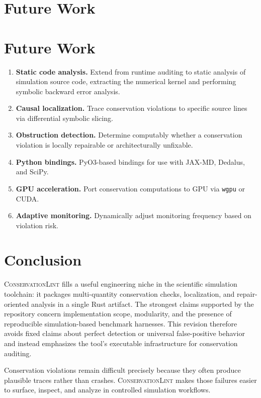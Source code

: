 \documentclass[11pt,a4paper]{article}
\begin{document}
\section{Future Work}

\section{Future Work}
\label{sec:future}

\begin{enumerate}
    \item \textbf{Static code analysis.} Extend from runtime auditing to static analysis of simulation source code, extracting the numerical kernel and performing symbolic backward error analysis.
    \item \textbf{Causal localization.} Trace conservation violations to specific source lines via differential symbolic slicing.
    \item \textbf{Obstruction detection.} Determine computably whether a conservation violation is locally repairable or architecturally unfixable.
    \item \textbf{Python bindings.} PyO3-based bindings for use with JAX-MD, Dedalus, and SciPy.
    \item \textbf{GPU acceleration.} Port conservation computations to GPU via \texttt{wgpu} or CUDA.
    \item \textbf{Adaptive monitoring.} Dynamically adjust monitoring frequency based on violation risk.
\end{enumerate}

\section{Conclusion}
\label{sec:conclusion}

\textsc{ConservationLint} fills a useful engineering niche in the
scientific simulation toolchain: it packages multi-quantity
conservation checks, localization, and repair-oriented analysis in a
single Rust artifact.  The strongest claims supported by the repository
concern implementation scope, modularity, and the presence of
reproducible simulation-based benchmark harnesses.  This revision
therefore avoids fixed claims about perfect detection or universal
false-positive behavior and instead emphasizes the tool's executable
infrastructure for conservation auditing.

Conservation violations remain difficult precisely because they often
produce plausible traces rather than crashes.  \textsc{ConservationLint}
makes those failures easier to surface, inspect, and analyze in
controlled simulation workflows.
\end{document}
